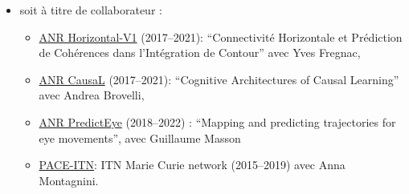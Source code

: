 \begin{itemize}
\item soit à titre de collaborateur :

\begin{itemize}
 \item \href{https://laurentperrinet.github.io/project/anr-horizontal-v1/}{ANR Horizontal-V1} (2017--2021): ``Connectivité Horizontale et Prédiction de Cohérences dans l’Intégration de Contour'' avec Yves Fregnac,  
 \item \href{https://laurentperrinet.github.io/project/anr-causal/}{ANR CausaL} (2017--2021): ``Cognitive Architectures of  Causal  Learning'' avec Andrea Brovelli,  
 \item \href{https://laurentperrinet.github.io/project/anr-predicteye/}{ANR PredictEye} (2018--2022) : ``Mapping and predicting trajectories for eye movements'', avec Guillaume Masson
	\item \href{https://laurentperrinet.github.io/project/pace-itn/}{PACE-ITN}: ITN Marie Curie network (2015--2019) avec Anna Montagnini.
\end{itemize}


\end{itemize}
